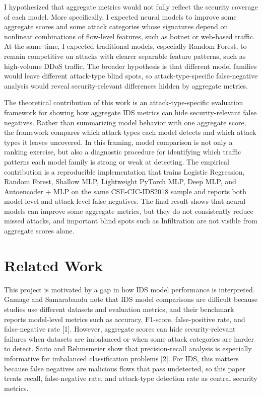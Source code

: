 \documentclass[sigconf,nonacm]{acmart}
\begin{document}
I hypothesized that aggregate metrics would not fully reflect the security coverage of each model.
More specifically, I expected neural models to improve some aggregate scores and some attack categories whose signatures depend on nonlinear combinations of flow-level features, such as botnet or web-based traffic.
At the same time, I expected traditional models, especially Random Forest, to remain competitive on attacks with clearer separable feature patterns, such as high-volume DDoS traffic.
The broader hypothesis is that different model families would leave different attack-type blind spots, so attack-type-specific false-negative analysis would reveal security-relevant differences hidden by aggregate metrics.

The theoretical contribution of this work is an attack-type-specific evaluation framework for showing how aggregate IDS metrics can hide security-relevant false negatives.
Rather than summarizing model behavior with one aggregate score, the framework compares which attack types each model detects and which attack types it leaves uncovered.
In this framing, model comparison is not only a ranking exercise, but also a diagnostic procedure for identifying which traffic patterns each model family is strong or weak at detecting.
The empirical contribution is a reproducible implementation that trains Logistic Regression, Random Forest, Shallow MLP, Lightweight PyTorch MLP, Deep MLP, and Autoencoder + MLP on the same CSE-CIC-IDS2018 sample and reports both model-level and attack-level false negatives.
The final result shows that neural models can improve some aggregate metrics, but they do not consistently reduce missed attacks, and important blind spots such as Infiltration are not visible from aggregate scores alone.

\section{Related Work}

This project is motivated by a gap in how IDS model performance is interpreted.
Gamage and Samarabandu note that IDS model comparisons are difficult because studies use different datasets and evaluation metrics, and their benchmark reports model-level metrics such as accuracy, F1-score, false-positive rate, and false-negative rate [1].
However, aggregate scores can hide security-relevant failures when datasets are imbalanced or when some attack categories are harder to detect.
Saito and Rehmsmeier show that precision-recall analysis is especially informative for imbalanced classification problems [2].
For IDS, this matters because false negatives are malicious flows that pass undetected, so this paper treats recall, false-negative rate, and attack-type detection rate as central security metrics.
\end{document}
